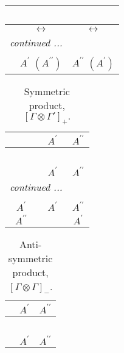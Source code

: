\documentclass[fleqn,10pt,landscape]{article}
\begin{document}
\begin{itemize}
\begin{center}
\begin{longtable}{ccc}
\multicolumn{2}{l}{\tablename\ \thetable{}} \\
 \hline \hline
 & $\leftrightarrow$ & $\leftrightarrow$ \\ \hline \endhead

 \hline \hline
\multicolumn{2}{r}{\footnotesize\it continued ...} \\ \endfoot

 \hline \hline
\multicolumn{2}{r}{} \\ \endlastfoot

 & $ A^{\prime}\,\,(A^{\prime\prime}) $ & $ A^{\prime\prime}\,\,(A^{\prime}) $ \\
\end{longtable}
\end{center}
\begin{center}
\renewcommand{\arraystretch}{1.0}
\begin{longtable}{c|cc}
\caption{Symmetric product, $[\Gamma\otimes\Gamma']_+.$}
 \\
 \hline \hline
 & $ A^{\prime} $ & $ A^{\prime\prime} $ \\ \hline \endfirsthead

\multicolumn{2}{l}{\tablename\ \thetable{}} \\
 \hline \hline
 & $ A^{\prime} $ & $ A^{\prime\prime} $ \\ \hline \endhead

 \hline \hline
\multicolumn{2}{r}{\footnotesize\it continued ...} \\ \endfoot

 \hline \hline
\multicolumn{2}{r}{} \\ \endlastfoot

$ A^{\prime} $ & $ A^{\prime} $ & $ A^{\prime\prime} $ \\
$ A^{\prime\prime} $ & $  $ & $ A^{\prime} $ \\
\end{longtable}
\end{center}
\begin{center}
\renewcommand{\arraystretch}{1.0}
\begin{longtable}{ccc}
\caption{Anti-symmetric product, $[\Gamma\otimes\Gamma]_-$.}
 \\
 \hline \hline
 & $ A^{\prime} $ & $ A^{\prime\prime} $ \\ \hline \endfirsthead

\multicolumn{2}{l}{\tablename\ \thetable{}} \\
 \hline \hline
 & $ A^{\prime} $ & $ A^{\prime\prime} $ \\ \hline \endhead


\end{longtable}
\end{center}
\end{itemize}
\end{document}
